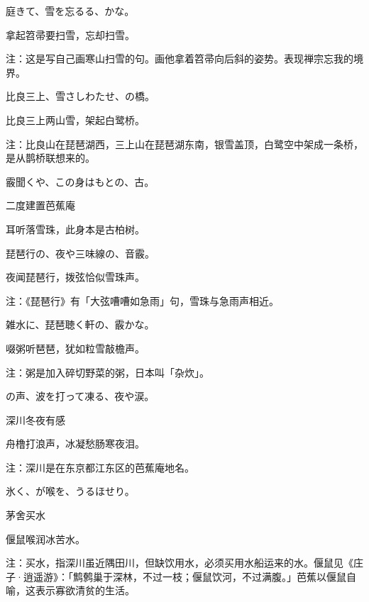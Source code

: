 \begin{haiku}
    {\FH 庭きて、雪を忘るる、かな。}

    {\FK 拿起笤帚要扫雪，忘却扫雪。}

    {\FT 注：这是写自己画寒山扫雪的句。画他拿着笤帚向后斜的姿势。表现禅宗忘我的境界。}
\end{haiku}

\begin{haiku}
    {\FH 比良三上、雪さしわたせ、の橋。}

    {\FK 比良三上两山雪，架起白鹭桥。}

    {\FT 注：比良山在琵琶湖西，三上山在琵琶湖东南，银雪盖顶，白鹭空中架成一条桥，是从鹊桥联想来的。}
\end{haiku}

\begin{haiku}
    {\FH 霰聞くや、この身はもとの、古。}

    {\FK 二度建置芭蕉庵}

    {\FK 耳听落雪珠，此身本是古柏树。}
\end{haiku}

\begin{haiku}
    {\FH 琵琶行の、夜や三味線の、音霰。}

    {\FK 夜闻琵琶行，拨弦恰似雪珠声。}

    {\FT 注：《琵琶行》有「大弦嘈嘈如急雨」句，雪珠与急雨声相近。}
\end{haiku}

\begin{haiku}
    {\FH 雑水に、琵琶聴く軒の、霰かな。}

    {\FK 啜粥听琶琶，犹如粒雪敲檐声。}

    {\FT 注：粥是加入碎切野菜的粥，日本叫「杂炊」。}
\end{haiku}

\begin{haiku}
    {\FH {}の声、波を打って凍る、夜や涙。}

    {\FK 深川冬夜有感}

    {\FK 舟橹打浪声，冰凝愁肠寒夜泪。}

    {\FT 注：深川是在东京都江东区的芭蕉庵地名。}
\end{haiku}

\begin{haiku}
    {\FH 氷く、が喉を、うるほせり。}

    {\FK 茅舍买水}

    {\FK 偃鼠喉润冰苦水。}

    {\FT 注：买水，指深川虽近隅田川，但缺饮用水，必须买用水船运来的水。偃鼠见《庄子·逍遥游》：「鹪鹩巢于深林，不过一枝；偃鼠饮河，不过满腹。」芭蕉以偃鼠自喻，这表示寡欲清贫的生活。}
\end{haiku}

